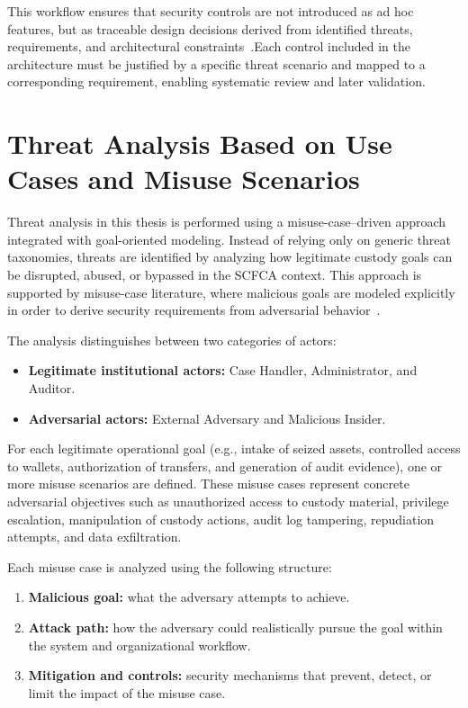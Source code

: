 \documentclass[12pt,a4paper]{report}
\begin{document}
This workflow ensures that security controls are not introduced as ad hoc features, but as traceable design decisions derived from identified threats, requirements, and architectural constraints~\cite{Schumacher2006,Fluchs2021}.Each control included in the architecture must be justified by a specific threat scenario and mapped to a corresponding requirement, enabling systematic review and later validation.

\section{Threat Analysis Based on Use Cases and Misuse Scenarios}

Threat analysis in this thesis is performed using a misuse-case--driven approach integrated with goal-oriented modeling. Instead of relying only on generic threat taxonomies, threats are identified by analyzing how legitimate custody goals can be disrupted, abused, or bypassed in the SCFCA context. This approach is supported by misuse-case literature, where malicious goals are modeled explicitly in order to derive security requirements from adversarial behavior~\cite{Sindre2001,Choi2006}.

The analysis distinguishes between two categories of actors:

\begin{itemize}
    \item \textbf{Legitimate institutional actors:} Case Handler, Administrator, and Auditor.
    \item \textbf{Adversarial actors:} External Adversary and Malicious Insider.
\end{itemize}

For each legitimate operational goal (e.g., intake of seized assets, controlled access to wallets, authorization of transfers, and generation of audit evidence), one or more misuse scenarios are defined. These misuse cases represent concrete adversarial objectives such as unauthorized access to custody material, privilege escalation, manipulation of custody actions, audit log tampering, repudiation attempts, and data exfiltration.

Each misuse case is analyzed using the following structure:

\begin{enumerate}
    \item \textbf{Malicious goal:} what the adversary attempts to achieve.
    \item \textbf{Attack path:} how the adversary could realistically pursue the goal within the system and organizational workflow.
    \item \textbf{Mitigation and controls:} security mechanisms that prevent, detect, or limit the impact of the misuse case.
\end{enumerate}
\end{document}
